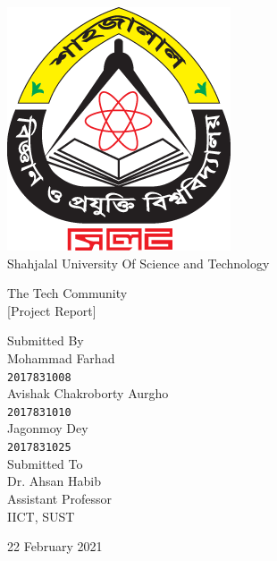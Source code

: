 \begin{titlepage}

\begin{center}

\includegraphics[scale=0.3]{./img/logo.png}\\[0.3cm]
{\Large Shahjalal University Of Science and Technology}\\[0.8cm]

\end{center}

\begin{center}

{\LARGE The Tech Community}\\[0.4cm]
{\Large [Project Report]}\\[1.8cm]

\hspace {3cm}

{\Large Submitted By}\\[0.8cm]

Mohammad Farhad\\
\texttt{2017831008}\\

\vspace {0.5cm}
Avishak Chakroborty Aurgho\\
\texttt{2017831010}\\

\vspace {0.5cm}
Jagonmoy Dey\\
\texttt{2017831025}\\[1.5cm]


{\Large Submitted To}\\[0.5cm]
Dr. Ahsan Habib\\
Assistant Professor\\
IICT, SUST

\vspace{2cm}
22 February 2021

\end{center}

\end{titlepage}
